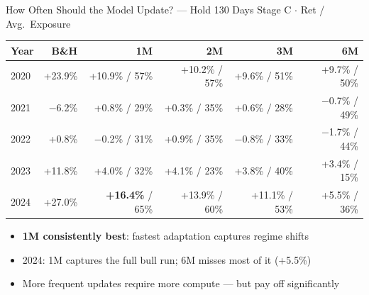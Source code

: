 \documentclass[aspectratio=169]{beamer}
\begin{document}
\begin{frame}{How Often Should the Model Update? — Hold 130 Days}
  \small
  Stage C $\cdot$ Ret / Avg.\ Exposure

  \vspace{0.4em}
  \begin{tabular}{lrrrrr}
    \toprule
    Year & B\&H & 1M & 2M & 3M & 6M \\
    \midrule
    2020 & +23.9\% & +10.9\% / 57\% & +10.2\% / 57\% & +9.6\% / 51\% & +9.7\% / 50\% \\
    2021 & $-$6.2\%  & +0.8\% / 29\% & +0.3\% / 35\% & +0.6\% / 28\% & $-$0.7\% / 49\% \\
    2022 & +0.8\%  & $-$0.2\% / 31\% & +0.9\% / 35\% & $-$0.8\% / 33\% & $-$1.7\% / 44\% \\
    2023 & +11.8\% & +4.0\% / 32\% & +4.1\% / 23\% & +3.8\% / 40\% & +3.4\% / 15\% \\
    2024 & +27.0\% & \textbf{+16.4\%} / 65\% & +13.9\% / 60\% & +11.1\% / 53\% & +5.5\% / 36\% \\
    \bottomrule
  \end{tabular}

  \vspace{0.5em}
  \begin{itemize}
    \item \textbf{1M consistently best}: fastest adaptation captures regime shifts
    \item 2024: 1M captures the full bull run; 6M misses most of it (+5.5\%)
    \item More frequent updates require more compute — but pay off significantly
  \end{itemize}
\end{frame}
\end{document}
